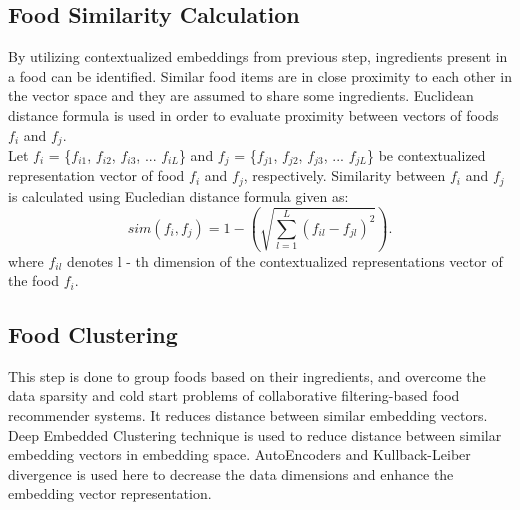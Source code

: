\subsection{Food Similarity Calculation}
By utilizing contextualized embeddings from previous step, ingredients present in a food can be identified. Similar food items are in close proximity to each other in the vector space and they are assumed to share some ingredients\cite*{9775081, oulu_tdlgc}. Euclidean distance formula is used in order to evaluate proximity between vectors of foods $f_i$ and $f_j$.
\\
\indent Let $f_i$ = \{$f_{i1}$, $f_{i2}$, $f_{i3}$, ... $f_{iL}$\} and $f_j$ = \{$f_{j1}$, $f_{j2}$, $f_{j3}$, ... $f_{jL}$\} be contextualized representation vector of food $f_i$ and $f_j$, respectively\cite*{9775081}. Similarity between $f_i$ and $f_j$ is calculated using Eucledian distance formula given as\cite*{9775081, oulu_tdlgc}:
\begin{equation*} sim\left({f_{i},f_{j}}\right)=1-\left({\sqrt {\sum _{l=1}^{L}\left({f_{il}-f_{jl}}\right)^{2}}}\right). \tag{5}\end{equation*}
where $f_{il}$ denotes l - th dimension of the contextualized representations vector of the food $f_i$.

\subsection{Food Clustering}
This step is done to group foods based on their ingredients, and overcome the data sparsity and cold start problems of collaborative filtering-based food recommender systems. It reduces distance between similar embedding vectors.
\\
\indent Deep Embedded Clustering technique is used to reduce distance between similar embedding vectors in embedding space\cite*{DBLP:journals/corr/XieGF15}. AutoEncoders and Kullback-Leiber divergence is used here to decrease the data dimensions and enhance the embedding vector representation\cite*{9775081, oulu_tdlgc}.


